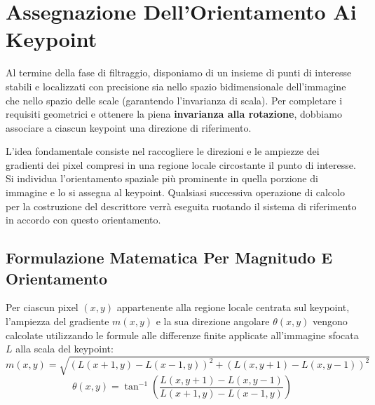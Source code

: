 ﻿\documentclass[11pt, a4paper]{article}
\begin{document}

\newpage

\section{Assegnazione Dell'Orientamento Ai Keypoint}

Al termine della fase di filtraggio, disponiamo di un insieme di punti di interesse stabili e localizzati con precisione sia nello spazio bidimensionale dell'immagine che nello spazio delle scale (garantendo l'invarianza di scala). Per completare i requisiti geometrici e ottenere la piena \textbf{invarianza alla rotazione}, dobbiamo associare a ciascun keypoint una direzione di riferimento.


L'idea fondamentale consiste nel raccogliere le direzioni e le ampiezze dei gradienti dei pixel compresi in una regione locale circostante il punto di interesse. Si individua l'orientamento spaziale più prominente in quella porzione di immagine e lo si assegna al keypoint. Qualsiasi successiva operazione di calcolo per la costruzione del descrittore verrà eseguita ruotando il sistema di riferimento in accordo con questo orientamento.

\subsection{Formulazione Matematica Per Magnitudo E Orientamento}

Per ciascun pixel $(x, y)$ appartenente alla regione locale centrata sul keypoint, l'ampiezza del gradiente $m(x, y)$ e la sua direzione angolare $\theta(x, y)$ vengono calcolate utilizzando le formule alle differenze finite applicate all'immagine sfocata $L$ alla scala del keypoint:
\[ m(x, y) = \sqrt{\left( L(x+1, y) - L(x-1, y) \right)^2 + \left( L(x, y+1) - L(x, y-1) \right)^2} \]
\[ \boxed{\theta(x, y) = \tan^{-1} \left( \frac{L(x, y+1) - L(x, y-1)}{L(x+1, y) - L(x-1, y)} \right)} \]

\end{document}
